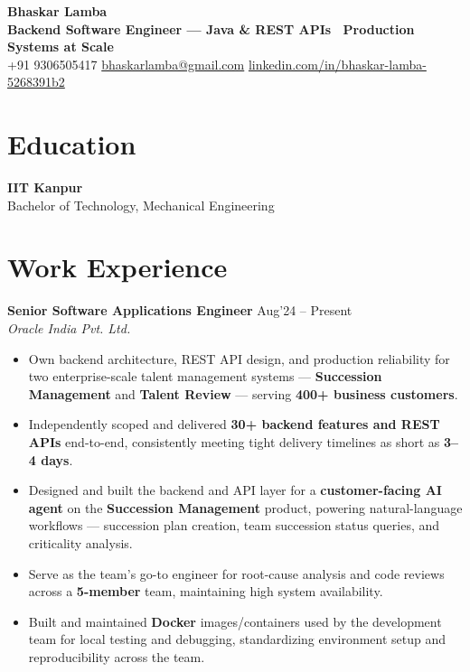 \documentclass[10pt,a4paper]{article}
\newcommand{\resumeItem}[1]{\item[\textcolor{primary}{\textbullet}] #1}
\begin{document}
\begin{center}
    {\LARGE\bfseries Bhaskar Lamba}\\[4pt]
    {\small\color{primary}\bfseries Backend Software Engineer --- Java \& REST APIs \textbar\ Production Systems at Scale}\\[3pt]
    \small
    +91 9306505417 \quad\textbar\quad
    \href{mailto:bhaskarlamba@gmail.com}{bhaskarlamba@gmail.com} \quad\textbar\quad
    \href{https://www.linkedin.com/in/bhaskar-lamba-5268391b2/}{linkedin.com/in/bhaskar-lamba-5268391b2}
\end{center}
\vspace{6pt}

\section{Education}
\small
\textbf{IIT Kanpur} \hfill {}\\
Bachelor of Technology, Mechanical Engineering

\section{Work Experience}
\small

\textbf{Senior Software Applications Engineer} \hfill Aug'24 -- Present\\
\textit{Oracle India Pvt. Ltd.}
\begin{itemize}[leftmargin=1.05em, nosep, topsep=0pt, itemsep=0pt, parsep=0pt]
    \resumeItem{Own backend architecture, REST API design, and production reliability for two enterprise-scale talent management systems --- \textbf{Succession Management} and \textbf{Talent Review} --- serving \textbf{400+ business customers}.}
    \resumeItem{Independently scoped and delivered \textbf{30+ backend features and REST APIs} end-to-end, consistently meeting tight delivery timelines as short as \textbf{3--4 days}.}
    \resumeItem{Designed and built the backend and API layer for a \textbf{customer-facing AI agent} on the \textbf{Succession Management} product, powering natural-language workflows --- succession plan creation, team succession status queries, and criticality analysis.}
    \resumeItem{Serve as the team's go-to engineer for root-cause analysis and code reviews across a \textbf{5-member} team, maintaining high system availability.}
    \resumeItem{Built and maintained \textbf{Docker} images/containers used by the development team for local testing and debugging, standardizing environment setup and reproducibility across the team.}
\end{itemize}
\end{document}
